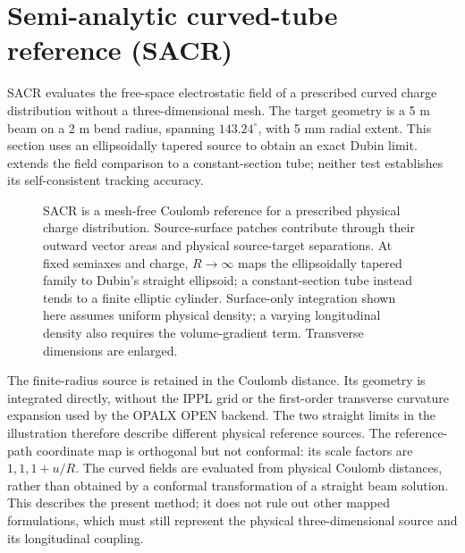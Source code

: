 \section{Semi-analytic curved-tube reference (SACR)}
\label{sec:sacr}
SACR evaluates the free-space electrostatic field of a prescribed curved charge
distribution without a three-dimensional mesh. The target geometry is a 5 m
beam on a 2 m bend radius, spanning $143.24^\circ$, with 5 mm radial extent.
This section uses an ellipsoidally tapered source to obtain an exact Dubin
limit.  extends the field comparison to a constant-section
tube; neither test establishes its self-consistent tracking accuracy.

\begin{figure}[H]
 \centering
 
 \caption{SACR is a mesh-free Coulomb reference for a prescribed physical
 charge distribution. Source-surface patches contribute through their
 outward vector areas and physical source-target separations. At fixed
 semiaxes and charge, $R\to\infty$ maps the ellipsoidally tapered family to
 Dubin's straight ellipsoid; a constant-section tube instead tends to a
 finite elliptic cylinder. Surface-only integration shown here assumes
 uniform physical density; a varying longitudinal density also requires
 the volume-gradient term. Transverse dimensions are enlarged.}
 \label{fig:sacr-reference-geometry}
\end{figure}
The finite-radius source is retained in the Coulomb distance. Its geometry
is integrated directly, without the IPPL grid or the first-order transverse
curvature expansion used by the OPALX OPEN backend. The two straight limits
in the illustration therefore describe different physical reference sources.
The reference-path coordinate map is orthogonal but not conformal: its scale
factors are $1,1,1+u/R$. The curved fields are evaluated from physical Coulomb
distances, rather than obtained by a conformal transformation of a straight
beam solution.
This describes the present method; it does not rule out other mapped
formulations, which must still represent the physical three-dimensional
source and its longitudinal coupling.

\clearpage

